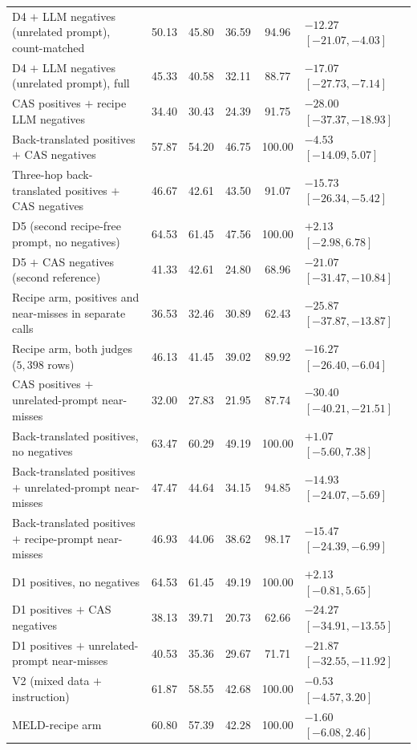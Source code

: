 \begin{table}[htbp]
\begin{tabular}{@{}p{3.7cm}cccc>{\centering\arraybackslash}p{3.1cm}@{}}
D4 $+$ LLM negatives (unrelated prompt), count-matched & 50.13 & 45.80 & 36.59 & 94.96 & $-12.27$ $[-21.07, -4.03]$ \\
D4 $+$ LLM negatives (unrelated prompt), full & 45.33 & 40.58 & 32.11 & 88.77 & $-17.07$ $[-27.73, -7.14]$ \\
CAS positives $+$ recipe LLM negatives & 34.40 & 30.43 & 24.39 & 91.75 & $-28.00$ $[-37.37, -18.93]$ \\
Back-translated positives $+$ CAS negatives & 57.87 & 54.20 & 46.75 & 100.00 & $-4.53$ $[-14.09, 5.07]$ \\
Three-hop back-translated positives $+$ CAS negatives & 46.67 & 42.61 & 43.50 & 91.07 & $-15.73$ $[-26.34, -5.42]$ \\
D5 (second recipe-free prompt, no negatives) & 64.53 & 61.45 & 47.56 & 100.00 & $+2.13$ $[-2.98, 6.78]$ \\
D5 $+$ CAS negatives (second reference) & 41.33 & 42.61 & 24.80 & 68.96 & $-21.07$ $[-31.47, -10.84]$ \\
Recipe arm, positives and near-misses in separate calls & 36.53 & 32.46 & 30.89 & 62.43 & $-25.87$ $[-37.87, -13.87]$ \\
Recipe arm, both judges ($5{,}398$ rows) & 46.13 & 41.45 & 39.02 & 89.92 & $-16.27$ $[-26.40, -6.04]$ \\
CAS positives $+$ unrelated-prompt near-misses & 32.00 & 27.83 & 21.95 & 87.74 & $-30.40$ $[-40.21, -21.51]$ \\
Back-translated positives, no negatives & 63.47 & 60.29 & 49.19 & 100.00 & $+1.07$ $[-5.60, 7.38]$ \\
Back-translated positives $+$ unrelated-prompt near-misses & 47.47 & 44.64 & 34.15 & 94.85 & $-14.93$ $[-24.07, -5.69]$ \\
Back-translated positives $+$ recipe-prompt near-misses & 46.93 & 44.06 & 38.62 & 98.17 & $-15.47$ $[-24.39, -6.99]$ \\
D1 positives, no negatives & 64.53 & 61.45 & 49.19 & 100.00 & $+2.13$ $[-0.81, 5.65]$ \\
D1 positives $+$ CAS negatives & 38.13 & 39.71 & 20.73 & 62.66 & $-24.27$ $[-34.91, -13.55]$ \\
D1 positives $+$ unrelated-prompt near-misses & 40.53 & 35.36 & 29.67 & 71.71 & $-21.87$ $[-32.55, -11.92]$ \\
V2 (mixed data $+$ instruction) & 61.87 & 58.55 & 42.68 & 100.00 & $-0.53$ $[-4.57, 3.20]$ \\
MELD-recipe arm & 60.80 & 57.39 & 42.28 & 100.00 & $-1.60$ $[-6.08, 2.46]$ \\
\bottomrule
\end{tabular}
\end{table}

